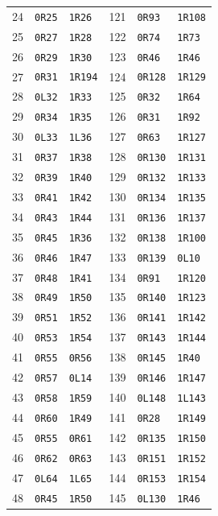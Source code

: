 \begin{longtable}{@{}rll@{\qquad}rll@{}}
24&\texttt{0R25}&\texttt{1R26}&121&\texttt{0R93}&\texttt{1R108}\\
25&\texttt{0R27}&\texttt{1R28}&122&\texttt{0R74}&\texttt{1R73}\\
26&\texttt{0R29}&\texttt{1R30}&123&\texttt{0R46}&\texttt{1R46}\\
27&\texttt{0R31}&\texttt{1R194}&124&\texttt{0R128}&\texttt{1R129}\\
28&\texttt{0L32}&\texttt{1R33}&125&\texttt{0R32}&\texttt{1R64}\\
29&\texttt{0R34}&\texttt{1R35}&126&\texttt{0R31}&\texttt{1R92}\\
30&\texttt{0L33}&\texttt{1L36}&127&\texttt{0R63}&\texttt{1R127}\\
31&\texttt{0R37}&\texttt{1R38}&128&\texttt{0R130}&\texttt{1R131}\\
32&\texttt{0R39}&\texttt{1R40}&129&\texttt{0R132}&\texttt{1R133}\\
33&\texttt{0R41}&\texttt{1R42}&130&\texttt{0R134}&\texttt{1R135}\\
34&\texttt{0R43}&\texttt{1R44}&131&\texttt{0R136}&\texttt{1R137}\\
35&\texttt{0R45}&\texttt{1R36}&132&\texttt{0R138}&\texttt{1R100}\\
36&\texttt{0R46}&\texttt{1R47}&133&\texttt{0R139}&\texttt{0L10}\\
37&\texttt{0R48}&\texttt{1R41}&134&\texttt{0R91}&\texttt{1R120}\\
38&\texttt{0R49}&\texttt{1R50}&135&\texttt{0R140}&\texttt{1R123}\\
39&\texttt{0R51}&\texttt{1R52}&136&\texttt{0R141}&\texttt{1R142}\\
40&\texttt{0R53}&\texttt{1R54}&137&\texttt{0R143}&\texttt{1R144}\\
41&\texttt{0R55}&\texttt{0R56}&138&\texttt{0R145}&\texttt{1R40}\\
42&\texttt{0R57}&\texttt{0L14}&139&\texttt{0R146}&\texttt{1R147}\\
43&\texttt{0R58}&\texttt{1R59}&140&\texttt{0L148}&\texttt{1L143}\\
44&\texttt{0R60}&\texttt{1R49}&141&\texttt{0R28}&\texttt{1R149}\\
45&\texttt{0R55}&\texttt{0R61}&142&\texttt{0R135}&\texttt{1R150}\\
46&\texttt{0R62}&\texttt{0R63}&143&\texttt{0R151}&\texttt{1R152}\\
47&\texttt{0L64}&\texttt{1L65}&144&\texttt{0R153}&\texttt{1R154}\\
48&\texttt{0R45}&\texttt{1R50}&145&\texttt{0L130}&\texttt{1R46}\\

\end{longtable}
